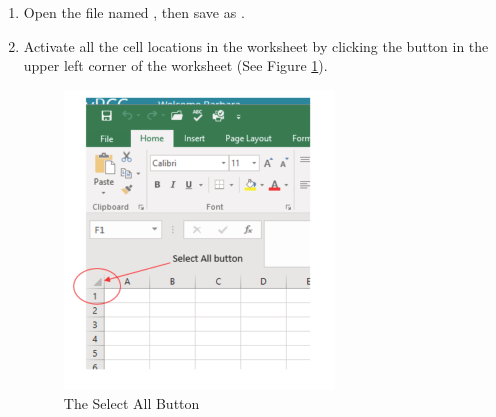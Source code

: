 \begin{enumbox}
	\begin{enumerate}
		\item Open the file named , then save as .
		\item Activate all the cell locations in the  worksheet by clicking the  button in the upper left corner of the worksheet (See Figure \ref{01:fig53}).

		\begin{figure}[H]
			\centering
			\includegraphics[width=\maxwidth{.95\linewidth}]{gfx/ch01_fig53}
			\caption{The Select All Button}
			\label{01:fig53}
		\end{figure}


\end{enumerate}
\end{enumbox}
